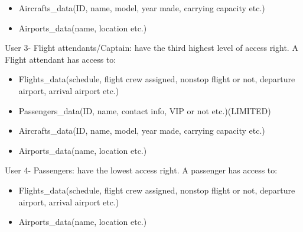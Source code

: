 \documentclass[10pt,conference]{IEEEtran}
\begin{document}
\begin{itemize}
\item Aircrafts\_data(ID, name, model, year made, carrying capacity etc.)
\end{itemize}

\begin{itemize}
\item Airports\_data(name, location etc.)
\end{itemize}




User 3- Flight attendants/Captain: have the third highest level of access right. A Flight attendant has access to:
\begin{itemize}
\item Flights\_data(schedule, flight crew assigned, nonstop flight or not, departure airport, arrival airport etc.)
\end{itemize}

\begin{itemize}
\item Passengers\_data(ID, name, contact info, VIP or not etc.)(LIMITED)
\end{itemize}

\begin{itemize}
\item Aircrafts\_data(ID, name, model, year made, carrying capacity etc.)
\end{itemize}

\begin{itemize}
\item Airports\_data(name, location etc.)
\end{itemize}




User 4- Passengers: have the lowest access right. A passenger has access to:
\begin{itemize}
\item Flights\_data(schedule, flight crew assigned, nonstop flight or not, departure airport, arrival airport etc.)
\end{itemize}

\begin{itemize}
\item Airports\_data(name, location etc.)
\end{itemize}\vspace{5mm}
\end{document}
